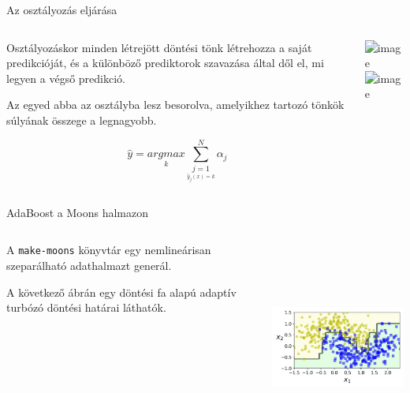 \documentclass[english, aspectratio=169]{beamer}
\begin{document}
\begin{frame}{Az osztályozás eljárása}
\begin{columns}
\begin{column}{.5\textwidth}
Osztályozáskor minden létrejött döntési tönk létrehozza a saját predikcióját, és a különböző prediktorok szavazása által dől el, mi legyen a végső predikció.\par\medskip
Az egyed abba az osztályba lesz besorolva, amelyikhez tartozó tönkök súlyának összege a legnagyobb. 
\begin{block}{}
\[
\hat{y} = \underset{k}{argmax} \sum_{\underset{\hat{y}_j\left(x\right)=k}{j=1}}^N \alpha_j
\]
\end{block}
\end{column}
\begin{column}{.5\textwidth}
\begin{center}
\includegraphics<1>[height=7cm, keepaspectratio]{graphs/ensemble_2.png}
\includegraphics<2>[height=7cm, keepaspectratio]{graphs/ensemble_3.png}
\end{center}
\end{column}
\end{columns}
\end{frame}

\begin{frame}{AdaBoost a Moons halmazon}
\begin{columns}
\begin{column}{.5\textwidth}
A \texttt{make-moons} könyvtár egy nemlineárisan szeparálható adathalmazt generál.\par\medskip
A következő ábrán egy döntési fa alapú adaptív turbózó döntési határai láthatók.
\end{column}
\begin{column}{.5\textwidth}
\begin{center}
\includegraphics[width=7cm, height=7cm, keepaspectratio]{images/ensemble_8.png}
\end{center}
\end{column}
\end{columns}
\end{frame}
\end{document}
